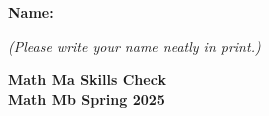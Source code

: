 \documentclass{article}
\begin{document}
 

 \noindent
{\large \mbox{} \hfill \bf Name:\underline{\hspace{3in}}}

 {\mbox{} \hfill \it (Please write your name neatly in print.)}


 
\medskip
 
\noindent
{\large\bf
Math Ma Skills Check \\ Math Mb Spring 2025}
\noindent

\end{document}
